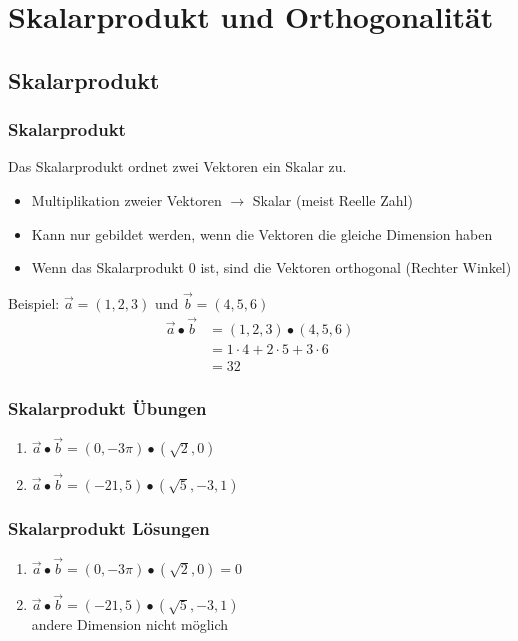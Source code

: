 \section{Skalarprodukt und Orthogonalität}
\subsection{Skalarprodukt}
\begin{frame}
    \frametitle{Skalarprodukt}
    Das Skalarprodukt ordnet zwei Vektoren ein Skalar zu.
    \begin{itemize}
	    \item Multiplikation zweier Vektoren $\rightarrow$ Skalar (meist Reelle Zahl)
	    \item Kann nur gebildet werden, wenn die Vektoren die gleiche Dimension haben
	    \item Wenn das Skalarprodukt 0 ist, sind die Vektoren orthogonal (Rechter Winkel)
    \end{itemize}
	Beispiel: $\vec{a} = (1,2,3)$ und $\vec{b} = (4,5,6)$
	\begin{align*}
		\vec{a} \bullet \vec{b} &= (1,2,3) \bullet (4,5,6) \\
		&= 1 \cdot 4 + 2 \cdot 5 + 3 \cdot 6 \\
		&= 32
	\end{align*}
\end{frame}


\begin{frame}
    \frametitle{Skalarprodukt Übungen}
	\begin{enumerate}
		\item $\vec{a} \bullet \vec{b} = (0, -3\pi) \bullet (\sqrt{2}, 0)$ 
		\item $\vec{a} \bullet \vec{b} = (-21, 5) \bullet (\sqrt{5}, -3, 1)$
	\end{enumerate}
\end{frame}

\begin{frame}
    \frametitle{Skalarprodukt Lösungen}
	\begin{enumerate}
		\item $\vec{a} \bullet \vec{b} = (0, -3\pi) \bullet (\sqrt{2}, 0) = 0$ 
		\item $\vec{a} \bullet \vec{b} = (-21, 5) \bullet (\sqrt{5}, -3, 1)$ \\andere Dimension nicht möglich
	\end{enumerate}
\end{frame}

